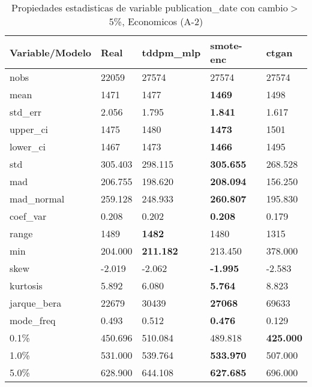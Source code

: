 \begin{table}[H]
\centering
\fontsize{8}{14}\selectfont
\caption{Propiedades estadisticas de variable publication\_date con cambio\ensuremath{>}5\%, Economicos (A-2)}
\label{table-stats-economicos-a-2-publication_date-short}
\begin{tabular}{|l|m{10em}|m{10em}|m{10em}|m{10em}|}
\hline
 \rowcolor[gray]{0.8}
Variable/Modelo & Real & tddpm\_mlp & smote-enc & ctgan \\
\hline nobs & 22059 & 27574 & 27574 & 27574 \\
\hline mean & 1471 & 1477 & \bfseries 1469 & \cellcolor[rgb]{0.9, 0.54, 0.52} 1498 \\
\hline std\_err & 2.056 & 1.795 & \bfseries 1.841 & \cellcolor[rgb]{0.9, 0.54, 0.52} 1.617 \\
\hline upper\_ci & 1475 & 1480 & \bfseries 1473 & \cellcolor[rgb]{0.9, 0.54, 0.52} 1501 \\
\hline lower\_ci & 1467 & 1473 & \bfseries 1466 & \cellcolor[rgb]{0.9, 0.54, 0.52} 1495 \\
\hline std & 305.403 & 298.115 & \bfseries 305.655 & \cellcolor[rgb]{0.9, 0.54, 0.52} 268.528 \\
\hline mad & 206.755 & 198.620 & \bfseries 208.094 & \cellcolor[rgb]{0.9, 0.54, 0.52} 156.250 \\
\hline mad\_normal & 259.128 & 248.933 & \bfseries 260.807 & \cellcolor[rgb]{0.9, 0.54, 0.52} 195.830 \\
\hline coef\_var & 0.208 & 0.202 & \bfseries 0.208 & \cellcolor[rgb]{0.9, 0.54, 0.52} 0.179 \\
\hline range & 1489 & \bfseries 1482 & 1480 & \cellcolor[rgb]{0.9, 0.54, 0.52} 1315 \\
\hline min & 204.000 & \bfseries 211.182 & 213.450 & \cellcolor[rgb]{0.9, 0.54, 0.52} 378.000 \\
\hline skew & -2.019 & -2.062 & \bfseries -1.995 & \cellcolor[rgb]{0.9, 0.54, 0.52} -2.583 \\
\hline kurtosis & 5.892 & 6.080 & \bfseries 5.764 & \cellcolor[rgb]{0.9, 0.54, 0.52} 8.823 \\
\hline jarque\_bera & 22679 & 30439 & \bfseries 27068 & \cellcolor[rgb]{0.9, 0.54, 0.52} 69633 \\
\hline mode\_freq & 0.493 & 0.512 & \bfseries 0.476 & \cellcolor[rgb]{0.9, 0.54, 0.52} 0.129 \\
\hline 0.1\% & 450.696 & \cellcolor[rgb]{0.9, 0.54, 0.52} 510.084 & 489.818 & \bfseries 425.000 \\
\hline 1.0\% & 531.000 & 539.764 & \bfseries 533.970 & \cellcolor[rgb]{0.9, 0.54, 0.52} 507.000 \\
\hline 5.0\% & 628.900 & 644.108 & \bfseries 627.685 & \cellcolor[rgb]{0.9, 0.54, 0.52} 696.000 \\
\hline
\end{tabular}
\end{table}
